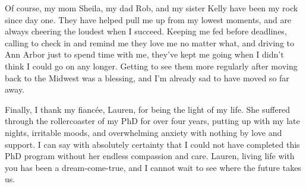Of course, my mom Sheila, my dad Rob, and my sister Kelly have been my rock since day one. They have helped pull me up from my lowest moments, and are always cheering the loudest when I succeed. Keeping me fed before deadlines, calling to check in and remind me they love me no matter what, and driving to Ann Arbor just to spend time with me, they've kept me going when I didn't think I could go on any longer. Getting to see them more regularly after moving back to the Midwest was a blessing, and I'm already sad to have moved so far away. 

Finally, I thank my fianc\'{e}e, Lauren, for being the light of my life. She suffered through the rollercoaster of my PhD for over four years, putting up with my late nights, irritable moods, and overwhelming anxiety with nothing by love and support. I can say with absolutely certainty that I could not have completed this PhD program without her endless compassion and care. Lauren, living life with you has been a dream-come-true, and I cannot wait to see where the future takes us.
